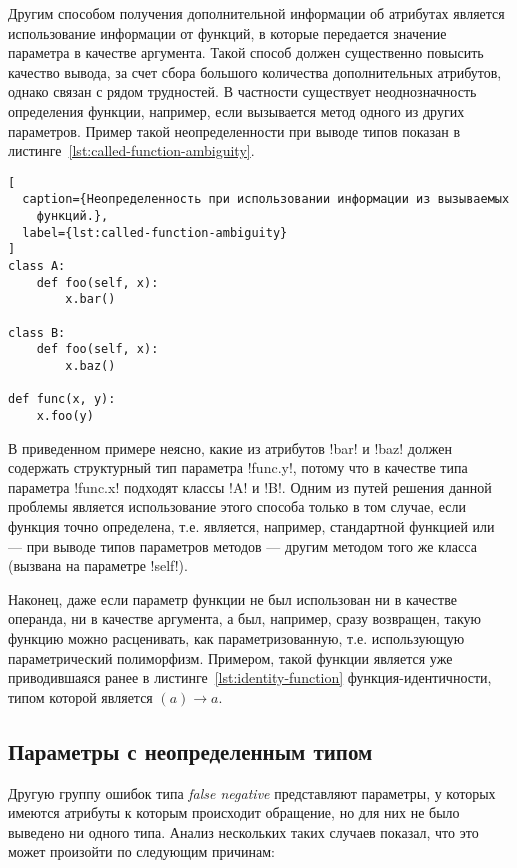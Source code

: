Другим способом получения дополнительной информации об атрибутах является
использование информации от функций, в которые передается значение параметра в
качестве аргумента. Такой способ должен существенно повысить качество вывода, за
счет сбора большого количества дополнительных атрибутов, однако связан с рядом
трудностей. В частности существует неоднозначность определения функции,
например, если вызывается метод одного из других параметров. Пример такой
неопределенности при выводе типов показан в
листинге~\ref{lst:called-function-ambiguity}.

\begin{lstlisting}[
  caption={Неопределенность при использовании информации из вызываемых
    функций.},
  label={lst:called-function-ambiguity}
]
class A:
    def foo(self, x):
        x.bar()

class B:
    def foo(self, x):
        x.baz()

def func(x, y):
    x.foo(y)
\end{lstlisting}

В приведенном примере неясно, какие из атрибутов !bar! и !baz! должен содержать
структурный тип параметра !func.y!, потому что в качестве типа параметра
!func.x! подходят классы !A! и !B!. Одним из путей решения данной проблемы
является использование этого способа только в том случае, если функция точно
определена, т.е. является, например, стандартной функцией или --- при выводе
типов параметров методов --- другим методом того же класса (вызвана на параметре
!self!).

Наконец, даже если параметр функции не был использован ни в качестве операнда,
ни в качестве аргумента, а был, например, сразу возвращен, такую функцию можно
расценивать, как параметризованную, т.е. использующую параметрический
полиморфизм. Примером, такой функции является уже приводившаяся ранее в
листинге~\ref{lst:identity-function} функция-идентичности, типом которой
является $(a) \rightarrow a$.

\subsection{Параметры с неопределенным типом}
\label{sub:undefined-type-parameters}

Другую группу ошибок типа \emph{false negative} представляют параметры, у которых
имеются атрибуты к которым происходит обращение, но для них не было выведено ни
одного типа. Анализ нескольких таких случаев показал, что это может произойти по
следующим причинам:


